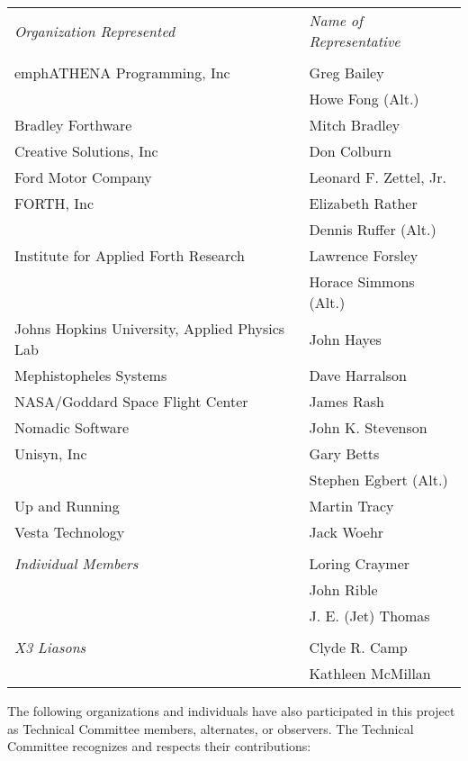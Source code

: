 \begin{supertabular}{p{0.65\linewidth}p{0.35\linewidth}}
\emph{Organization Represented} & \emph{Name of Representative} \\
\\emph{ATHENA} Programming, Inc	\dotfill& Greg Bailey \\
										& Howe Fong (Alt.) \\
Bradley Forthware				\dotfill& Mitch Bradley \\
Creative Solutions, Inc			\dotfill& Don Colburn \\
Ford Motor Company				\dotfill& Leonard F. Zettel, Jr. \\
FORTH, Inc						\dotfill& Elizabeth Rather \\
										& Dennis Ruffer (Alt.) \\
Institute for Applied Forth Research
								\dotfill& Lawrence Forsley \\
										& Horace Simmons (Alt.) \\
Johns Hopkins University, Applied Physics Lab
								\dotfill& John Hayes \\
Mephistopheles Systems			\dotfill& Dave Harralson \\
NASA/Goddard Space Flight Center\dotfill& James Rash \\
Nomadic Software				\dotfill& John K. Stevenson \\
Unisyn, Inc						\dotfill& Gary Betts \\
										& Stephen Egbert (Alt.) \\
Up and Running					\dotfill& Martin Tracy \\
Vesta Technology 				\dotfill& Jack Woehr \\
\\
\emph{Individual Members}				& Loring Craymer \\
										& John Rible \\
										& J. E. (Jet) Thomas \\
\\
\emph{X3 Liasons}						& Clyde R. Camp \\
										& Kathleen McMillan \\
\end{supertabular}

The following organizations and individuals have also participated
in this project as Technical Committee members, alternates, or
observers. The Technical Committee recognizes and respects their
contributions:

